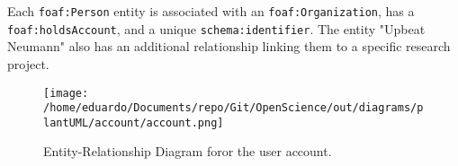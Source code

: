 \documentclass{article}
\begin{document}
    
    Each \texttt{foaf:Person} entity is associated with an \texttt{foaf:Organization}, has a \texttt{foaf:holdsAccount}, and a unique \texttt{schema:identifier}. The entity "Upbeat Neumann" also has an additional relationship linking them to a specific research project.
    
    \vspace{1cm}
    
    \begin{figure}[H]
        \centering
        \texttt{[image: /home/eduardo/Documents/repo/Git/OpenScience/out/diagrams/plantUML/account/account.png]}  %
        \caption{Entity-Relationship Diagram foror the user account.}
        \label{fig:er-diagram}
    \end{figure}
    
    
\end{document}
